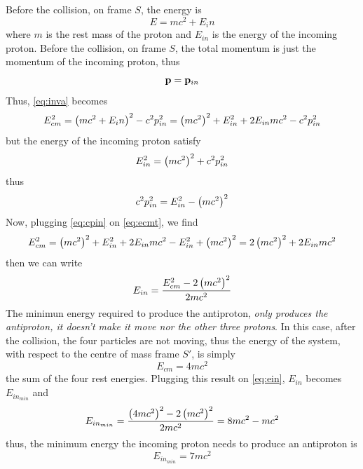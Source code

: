 \documentclass[oneside, 10pt, notitlepage]{book}
\begin{document}
Before the collision, on frame \(S\), the energy is 
\begin{equation}
    E = mc^2 + E_in
\end{equation}
where \(m\) is the rest mass of the proton and \(E_{in}\) is the energy of the incoming proton. Before the collision, on frame \(S\), the total momentum is just the momentum of the incoming proton, thus 
\begin{equation}
    \vb{p} = \vb{p}_{in}
\end{equation}
Thus, \eqref{eq:inva} becomes 
\begin{equation}\label{eq:ecmt}
    E_{cm}^2 = \left(mc^2 + E_in\right)^2 - c^2 p_{in}^2 = \left(mc^2\right)^2 + E_{in}^2 + 2 E_{in}mc^2 - c^2 p_{in}^2
\end{equation}
but the energy of the incoming proton satisfy
\begin{equation}
    E^2_{in} = \left(mc^2\right)^2 + c^2 p_{in}^2
\end{equation}
thus 
\begin{equation}\label{eq:cpin}
    c^2 p_{in}^2 = E^2_{in} - \left(mc^2\right)^2
\end{equation}
Now, plugging \eqref{eq:cpin} on \eqref{eq:ecmt}, we find
\begin{equation}
    E_{cm}^2 = \left(mc^2\right)^2 + E_{in}^2 + 2 E_{in}mc^2 - E^2_{in} + \left(mc^2\right)^2 = 2\left(mc^2\right)^2 + 2 E_{in}mc^2
\end{equation}
then we can write 
\begin{equation}\label{eq:ein}
    E_{in} = \frac{E_{cm}^2 - 2\left(mc^2\right)^2}{2mc^2}
\end{equation}
The minimun energy required to produce the antiproton, \emph{only produces the antiproton, it doesn't make it move nor the other three protons}. In this case, after the collision, the four particles are not moving, thus the energy of the system, with respect to the centre of mass frame \(S'\), is simply 
\begin{equation}
    E_{cm} = 4mc^2
\end{equation}
the sum of the four rest energies. Plugging this result on \eqref{eq:ein}, \(E_{in}\) becomes \(E_{in_{min}}\) and 
\begin{equation}
    E_{in_{min}} = \frac{\left(4mc^2\right)^2 - 2\left(mc^2\right)^2}{2mc^2} = 8mc^2 - mc^2
\end{equation}
thus, the minimum energy the incoming proton needs to produce an antiproton is 
\begin{equation}
    E_{in_{min}} = 7mc^2
\end{equation}
\end{document}
